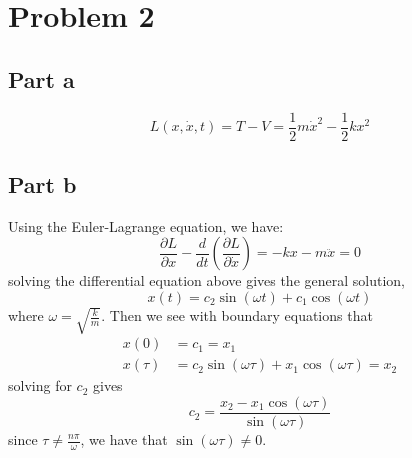 \documentclass[12pt]{report}
\begin{document}
\section*{Problem 2}
\subsection*{Part a}
\begin{equation*}
  L(x, \dot{x}, t) = T - V = \frac{1}{2}m\dot{x}^2 - \frac{1}{2}kx^2
\end{equation*}
\subsection*{Part b}
Using the Euler-Lagrange equation, we have:
\begin{equation*}
  \frac{\partial L}{\partial x} - \frac{d}{dt}\left(\frac{\partial L}{\partial \dot{x}}\right) = -kx - m \ddot{x} = 0
\end{equation*}
solving the differential equation above gives the general solution,
\begin{equation*}
  x(t) = c_2 \sin\left(\omega t\right) + c_1 \cos\left(\omega t\right)
\end{equation*}
where $\omega = \sqrt{\frac{k}{m}}$. Then we see with boundary equations that
\begin{align*}
  x(0) &= c_1 = x_1 \\
  x(\tau) &= c_2 \sin\left(\omega \tau\right) + x_1 \cos\left(\omega \tau\right) = x_2
\end{align*}
solving for $c_2$ gives
\begin{equation*}
  c_2 = \frac{x_2 - x_1 \cos\left(\omega \tau\right)}{\sin\left(\omega \tau\right)}
\end{equation*}
since $\tau \neq \frac{n\pi}{\omega}$, we have that $\sin(\omega \tau) \neq 0$. 
\end{document}
